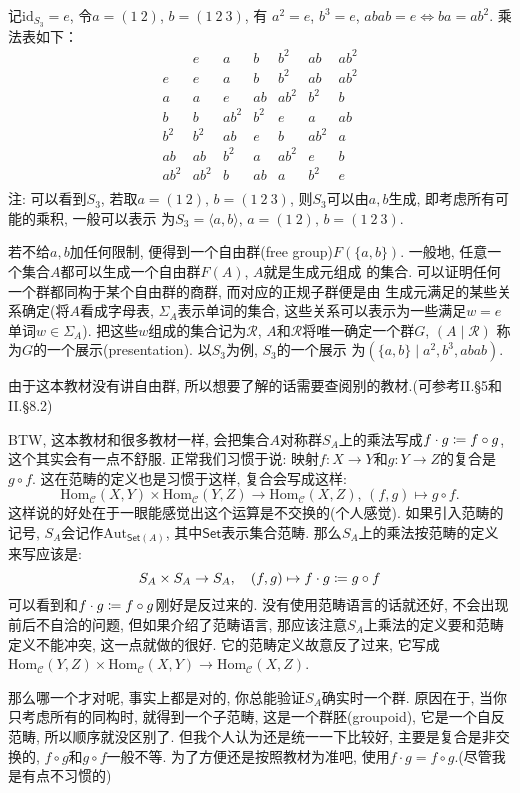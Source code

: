 \begin{solution}
    记$\mathrm{id}_{S_3} = e$, 令$a = (1\:2)$, $b = (1\:2\:3)$, 有
$a^2 = e$, $b^3 = e$, $abab = e \iff ba = ab^2$. 乘法表如下：
\[
\begin{array}{c|cccccc}
  & e   & a   & b   & b^2 & ab  & ab^2 \\
\hline
e  & e   & a   & b   & b^2 & ab  & ab^2 \\
a  & a   & e   & ab  & ab^2 & b^2 & b \\
b  & b   & ab^2 & b^2 & e   & a   & ab \\
b^2 & b^2 & ab  & e   & b   & ab^2 & a \\
ab & ab  & b^2 & a   & ab^2 & e   & b \\
ab^2 & ab^2 & b   & ab  & a   & b^2 & e \\
\end{array}
\]
注: 可以看到$S_3$, 若取$a = (1\:2),\, b = (1\:2\:3)$,
则$S_3$可以由$a, b$生成, 即考虑所有可能的乘积, 一般可以表示
为$S_3 = \langle a, b \rangle,\, a = (1\:2),\, b = (1\:2\:3)$.

若不给$a, b$加任何限制, 便得到一个自由群(free group)$F(\{a, b\})$.
一般地, 任意一个集合$A$都可以生成一个自由群$F(A)$, $A$就是生成元组成
的集合. 可以证明任何一个群都同构于某个自由群的商群, 而对应的正规子群便是由
生成元满足的某些关系确定(将$A$看成字母表, $\Sigma_A$表示单词的集合,
这些关系可以表示为一些满足$w = e$单词$w \in \Sigma_A$).
把这些$w$组成的集合记为$\mathscr{R}$,
$A$和$\mathscr{R}$将唯一确定一个群$G$, $(A \mid \mathscr{R})$
称为$G$的一个展示(presentation). 以$S_3$为例, $S_3$的一个展示
为$(\{a, b\} \mid a^2, b^3, abab)$.

由于这本教材没有讲自由群, 所以想要了解的话需要查阅别的教材.(可参考\cite{aluffi2009algebra}II.\S5和II.\S8.2)

BTW, 这本教材和很多教材一样, 会把集合$A$对称群$S_A$上的乘法写成$f \cdot g \mathrel{\coloneqq} f \circ g$, 这个其实会有一点不舒服. 正常我们习惯于说: 映射$f:X \to Y$和$g:Y \to Z$的复合是$g \circ f$. 这在范畴的定义也是习惯于这样, 复合会写成这样:
\[
    \mathrm{Hom}_{\mathcal{C}}(X, Y) \times \mathrm{Hom}_{\mathcal{C}}(Y, Z) \to \mathrm{Hom}_{\mathcal{C}}(X, Z),\, (f, g) \mapsto g \circ f.
\]
这样说的好处在于一眼能感觉出这个运算是不交换的(个人感觉). 如果引入范畴的记号, $S_A$会记作$\mathrm{Aut}_{\mathsf{Set}(A)}$, 其中$\mathsf{Set}$表示集合范畴. 那么$S_A$上的乘法按范畴的定义来写应该是:
\[
    S_A \times S_A \to S_A,\quad (f, g) \mapsto f \cdot g \mathrel{\coloneqq} g \circ f
\]
可以看到和$f \cdot g \mathrel{\coloneqq} f \circ g$刚好是反过来的. 没有使用范畴语言的话就还好, 不会出现前后不自洽的问题, 但如果介绍了范畴语言, 那应该注意$S_A$上乘法的定义要和范畴定义不能冲突, 这一点\cite{hungerford2003algebra}就做的很好. 它的范畴定义故意反了过来, 它写成$\mathrm{Hom}_{\mathcal{C}}(Y, Z) \times \mathrm{Hom}_{\mathcal{C}}(X, Y) \to \mathrm{Hom}_{\mathcal{C}}(X, Z)$.

那么哪一个才对呢, 事实上都是对的, 你总能验证$S_A$确实时一个群. 原因在于, 当你只考虑所有的同构时, 就得到一个子范畴, 这是一个群胚(groupoid), 它是一个自反范畴, 所以顺序就没区别了. 但我个人认为还是统一一下比较好, 主要是复合是非交换的, $f \circ g$和$g \circ f$一般不等. 为了方便还是按照教材为准吧, 使用$f \cdot g = f \circ g$.(尽管我是有点不习惯的)
\end{solution}

